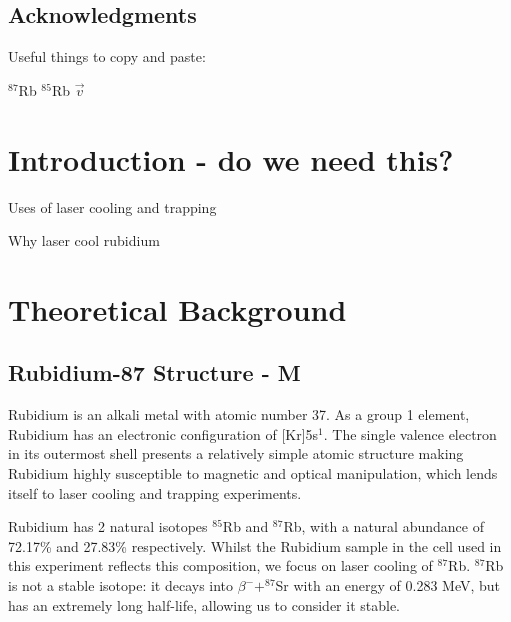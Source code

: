 \documentclass[12pt,twoside]{article}
\begin{document}
\section*{Acknowledgments}

Useful things to copy and paste:

$^{87}$Rb
$^{85}$Rb
$\vec{v}$
\hspace{10pt}



\tableofcontents 


\clearpage{\pagestyle{empty}\cleardoublepage}
\setcounter{page}{1}
\fancyhead[LE,RO]{\slshape \rightmark}
\fancyhead[LO,RE]{\slshape \leftmark}

\chapter{Introduction - do we need this?}

Uses of laser cooling and trapping

Why laser cool rubidium

\chapter{Theoretical Background}
\section{Rubidium-87 Structure - M}

\hspace{10pt} Rubidium is an alkali metal with atomic number 37. As a group 1 element, Rubidium has an electronic configuration of [Kr]5s$^1$. The single valence electron in its outermost shell presents a relatively simple atomic structure making Rubidium highly susceptible to magnetic and optical manipulation, which lends itself to laser cooling and trapping experiments. 

Rubidium has 2 natural isotopes $^{85}$Rb and $^{87}$Rb, with a natural abundance of  72.17\% and 27.83\% respectively. Whilst the Rubidium sample in the cell used in this experiment reflects this composition, we focus on laser cooling of $^{87}$Rb. $^{87}$Rb is not a stable isotope: it decays into $\beta^{-} + ^{87}$Sr with an energy of 0.283 MeV, but has an extremely long half-life, allowing us to consider it stable.
\end{document}
